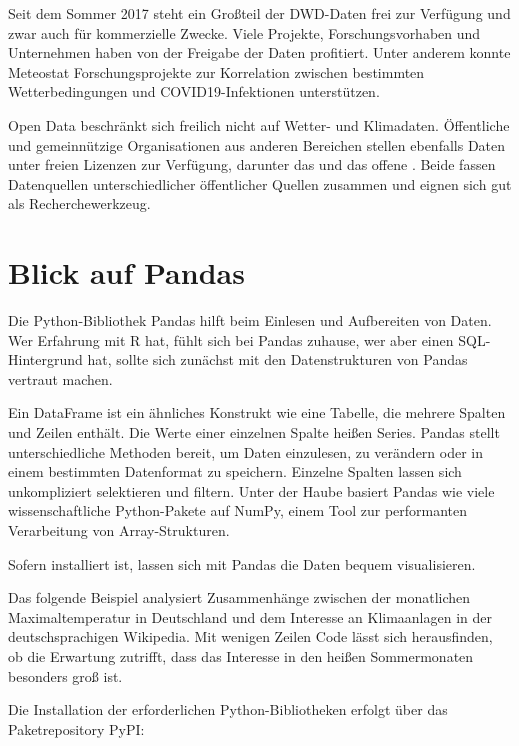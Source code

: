Seit dem Sommer 2017 steht ein Großteil der DWD-Daten frei zur Verfügung und zwar auch für kommerzielle Zwecke. Viele Projekte, Forschungsvorhaben und Unternehmen haben von der Freigabe der Daten profitiert. Unter anderem konnte Meteostat Forschungsprojekte zur Korrelation zwischen bestimmten Wetterbedingungen und COVID19-Infektionen unterstützen.

Open Data beschränkt sich freilich nicht auf Wetter- und Klimadaten. Öffentliche und gemeinnützige Organisationen aus anderen Bereichen stellen ebenfalls Daten unter freien Lizenzen zur Verfügung, darunter das  und das offene . Beide fassen Datenquellen unterschiedlicher öffentlicher Quellen zusammen und eignen sich gut als Recherchewerkzeug.

\section{Blick auf Pandas}

Die Python-Bibliothek Pandas hilft beim Einlesen und Aufbereiten von Daten. Wer Erfahrung mit R hat, fühlt sich bei Pandas zuhause, wer aber einen SQL-Hintergrund hat, sollte sich zunächst mit den Datenstrukturen von Pandas vertraut machen.

Ein DataFrame ist ein ähnliches Konstrukt wie eine Tabelle, die mehrere Spalten und Zeilen enthält. Die Werte einer einzelnen Spalte heißen Series. Pandas stellt unterschiedliche Methoden bereit, um Daten einzulesen, zu verändern oder in einem bestimmten Datenformat zu speichern. Einzelne Spalten lassen sich unkompliziert selektieren und filtern. Unter der Haube basiert Pandas wie viele wissenschaftliche Python-Pakete auf NumPy, einem Tool zur performanten Verarbeitung von Array-Strukturen.

Sofern  installiert ist, lassen sich mit Pandas die Daten bequem visualisieren.

Das folgende Beispiel analysiert Zusammenhänge zwischen der monatlichen Maximaltemperatur in Deutschland und dem Interesse an Klimaanlagen in der deutschsprachigen Wikipedia. Mit wenigen Zeilen Code lässt sich herausfinden, ob die Erwartung zutrifft, dass das Interesse in den heißen Sommermonaten besonders groß ist.

Die Installation der erforderlichen Python-Bibliotheken erfolgt über das Paketrepository PyPI:

